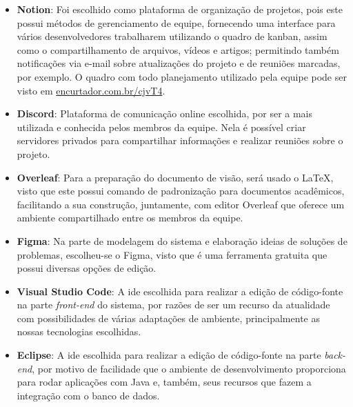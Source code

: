 \begin{itemize}
\item \textbf{Notion}: Foi escolhido como plataforma de organização de projetos, pois este possui métodos de gerenciamento de equipe, fornecendo uma interface para vários desenvolvedores trabalharem utilizando o quadro de kanban, assim como o compartilhamento de arquivos, vídeos e artigos; permitindo também notificações via e-mail sobre atualizações do projeto e de reuniões marcadas, por exemplo. O quadro com todo planejamento utilizado pela equipe pode ser visto em \href{encurtador.com.br/cjvT4}{encurtador.com.br/cjvT4}.
    
\item \textbf{Discord}: Plataforma de comunicação online escolhida, por ser a mais utilizada e conhecida pelos membros da equipe. Nela é possível criar servidores privados para compartilhar informações e realizar reuniões sobre o projeto.
    
\item \textbf{Overleaf}: Para a preparação do documento de visão, será usado o \LaTeX, visto que este possui comando de padronização para documentos acadêmicos, facilitando a sua construção, juntamente, com editor Overleaf que oferece um ambiente compartilhado entre os membros da equipe. 
    
\item \textbf{Figma}: Na parte de modelagem do sistema e elaboração ideias de soluções de problemas, escolheu-se o Figma, visto que é uma ferramenta gratuita que possui diversas opções de edição.
    
\item \textbf{Visual Studio Code}: A \acs{ide} escolhida para realizar a edição de código-fonte na parte \textsl{\gls{front-end}} do sistema, por razões de ser um recurso da atualidade com possibilidades de várias adaptações de ambiente, principalmente as nossas tecnologias escolhidas.

\item \textbf{Eclipse}: A \acs{ide} escolhida para realizar a edição de código-fonte na parte \textsl{\gls{back-end}}, por motivo de facilidade que o ambiente de desenvolvimento proporciona para rodar aplicações com Java e, também, seus recursos que fazem a integração com o banco de dados.
\end{itemize}


